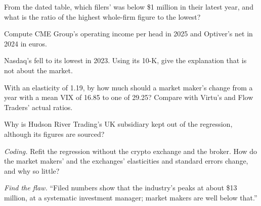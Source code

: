\begin{exercise}[$\star$]\label{exo:in:revenue-and-profit-across-the-industry:2}
From the dated table, which filers'  was below \$1 million in their latest year, and what is the ratio
of the highest whole-firm figure to the lowest?
\end{exercise}

\begin{exercise}[$\star$]\label{exo:in:revenue-and-profit-across-the-industry:3}
Compute CME Group's operating income per head in 2025 and Optiver's net  in 2024 in euros.
\end{exercise}

\begin{exercise}[$\star\star$]\label{exo:in:revenue-and-profit-across-the-industry:4}
Nasdaq's  fell to its lowest in 2023. Using its 10-K, give the explanation that is not about the market.
\end{exercise}

\begin{exercise}[$\star\star$]\label{exo:in:revenue-and-profit-across-the-industry:5}
With an elasticity of 1.19, by how much should a market maker's  change from a year with a mean VIX of
16.85 to one of 29.25? Compare with Virtu's and Flow Traders' actual ratios.
\end{exercise}

\begin{exercise}[$\star\star$]\label{exo:in:revenue-and-profit-across-the-industry:6}
Why is Hudson River Trading's UK subsidiary kept out of the regression, although its figures are sourced?
\end{exercise}

\begin{exercise}[$\star\star\star$]\label{exo:in:revenue-and-profit-across-the-industry:7}
\emph{Coding.} Refit the regression without the crypto exchange and the broker. How do the market makers' and the
exchanges' elasticities and standard errors change, and why so little?
\end{exercise}

\begin{exercise}[$\star\star\star$]\label{exo:in:revenue-and-profit-across-the-industry:8}
\emph{Find the flaw.} ``Filed numbers show that the industry's  peaks at about \$13 million, at a
systematic investment manager; market makers are well below that.''
\end{exercise}


